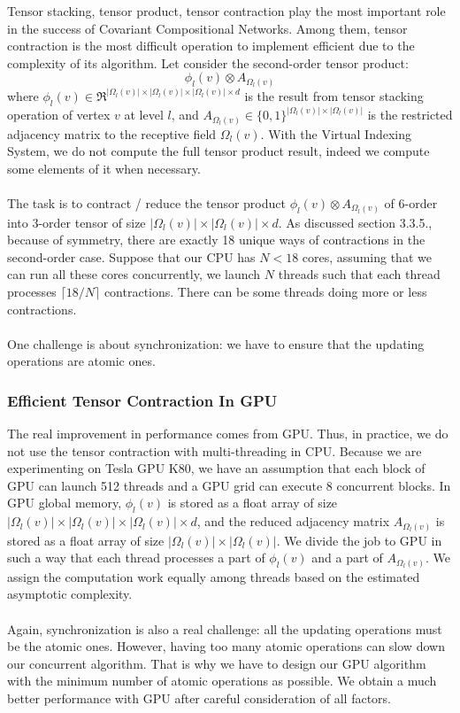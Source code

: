 \documentclass[a4paper]{article}
\begin{document}
Tensor stacking, tensor product, tensor contraction play the most important role in the success of Covariant Compositional Networks. Among them, tensor contraction is the most difficult operation to implement efficient due to the complexity of its algorithm. Let consider the second-order tensor product:
$$\phi_l(v) \otimes A_{\Omega_l(v)}$$
where $\phi_l(v) \in \Re^{|\Omega_l(v)| \times |\Omega_l(v)| \times |\Omega_l(v)| \times d}$ is the result from tensor stacking operation of vertex $v$ at level $l$, and $A_{\Omega_l(v)} \in \{0, 1\}^{|\Omega_l(v)| \times |\Omega_l(v)|}$ is the restricted adjacency matrix to the receptive field $\Omega_l(v)$. With the Virtual Indexing System, we do not compute the full tensor product result, indeed we compute some elements of it when necessary. \\ \\
The task is to contract / reduce the tensor product $\phi_l(v) \otimes A_{\Omega_l(v)}$ of 6-order into 3-order tensor of size $|\Omega_l(v)| \times |\Omega_l(v)| \times d$. As discussed section 3.3.5., because of symmetry, there are exactly 18 unique ways of contractions in the second-order case. Suppose that our CPU has $N < 18$ cores, assuming that we can run all these cores concurrently, we launch $N$ threads such that each thread processes $\lceil 18 / N \rceil$ contractions. There can be some threads doing more or less contractions. \\ \\
One challenge is about synchronization: we have to ensure that the updating operations are atomic ones.

\subsubsection{Efficient Tensor Contraction In GPU}

The real improvement in performance comes from GPU. Thus, in practice, we do not use the tensor contraction with multi-threading in CPU. Because we are experimenting on Tesla GPU K80, we have an assumption that each block of GPU can launch 512 threads and a GPU grid can execute 8 concurrent blocks. In GPU global memory, $\phi_l(v)$ is stored as a float array of size $|\Omega_l(v)| \times |\Omega_l(v)| \times |\Omega_l(v)| \times d$, and the reduced adjacency matrix $A_{\Omega_l(v)}$ is stored as a float array of size $|\Omega_l(v)| \times |\Omega_l(v)|$. We divide the job to GPU in such a way that each thread processes a part of $\phi_l(v)$ and a part of $A_{\Omega_l(v)}$. We assign the computation work equally among threads based on the estimated asymptotic complexity. \\ \\
Again, synchronization is also a real challenge: all the updating operations must be the atomic ones. However, having too many atomic operations can slow down our concurrent algorithm. That is why we have to design our GPU algorithm with the minimum number of atomic operations as possible. We obtain a much better performance with GPU after careful consideration of all factors.
\end{document}
